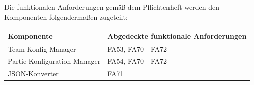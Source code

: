 Die funktionalen Anforderungen gemäß dem Pflichtenheft werden den Komponenten folgendermaßen zugeteilt:

\begin{table}[h]
    \centering
    \begin{tabular}{|l|l|}
        \hline
        \textbf{Komponente} & \textbf{Abgedeckte funktionale Anforderungen}\\ \hline         
        
        Team-Konfig-Manager & FA53, FA70 - FA72 \\ \hline

        Partie-Konfiguration-Manager & FA54, FA70 - FA72 \\ \hline

        JSON-Konverter & FA71 \\ \hline


    \end{tabular}
\end{table}

